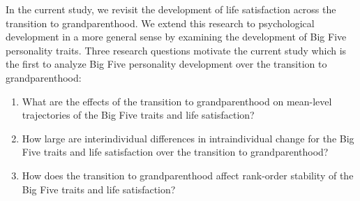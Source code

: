 \documentclass[
  english,
  man, noextraspace]{apa7}
\providecommand{\tightlist}{%
  \setlength{\itemsep}{0pt}\setlength{\parskip}{0pt}}
\begin{document}
In the current study, we revisit the development of life satisfaction across the transition to grandparenthood. We extend this research to psychological development in a more general sense by examining the development of Big Five personality traits. Three research questions motivate the current study which is the first to analyze Big Five personality development over the transition to grandparenthood:

\begin{enumerate}
\def\labelenumi{\arabic{enumi}.}
\tightlist
\item
  What are the effects of the transition to grandparenthood on mean-level trajectories of the Big Five traits and life satisfaction?
\item
  How large are interindividual differences in intraindividual change for the Big Five traits and life satisfaction over the transition to grandparenthood?
\item
  How does the transition to grandparenthood affect rank-order stability of the Big Five traits and life satisfaction?
\end{enumerate}
\end{document}
